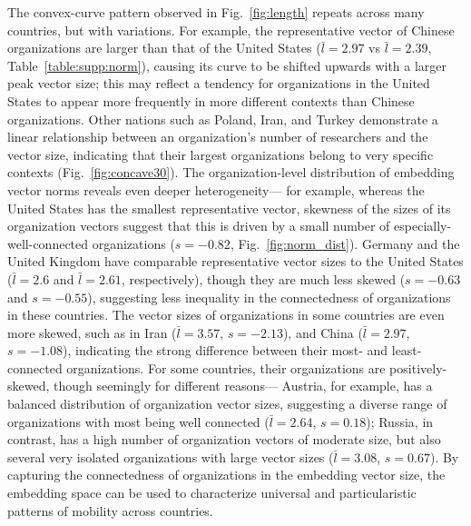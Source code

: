 \documentclass[12pt]{article} %
\begin{document}
The convex-curve pattern observed in Fig.~\ref{fig:length} repeats across many countries, but with variations.
For example, the representative vector of Chinese organizations are larger than that of the United States ($\bar{l} = 2.97$ vs $\bar{l} = 2.39$, Table~\ref{table:supp:norm}),  causing its curve to be shifted upwards with a larger peak vector size;
this may reflect a tendency for organizations in the United States to appear more frequently in more different contexts than Chinese organizations.
Other nations such as Poland, Iran, and Turkey demonstrate a linear relationship between an organization's number of researchers and the vector size, indicating that their largest organizations belong to very specific contexts (Fig.~\ref{fig:concave30}).
The organization-level distribution of embedding vector norms reveals even deeper heterogeneity---
for example, whereas the United States has the smallest representative vector, skewness of the sizes of its organization vectors suggest that this is driven by a small number of especially-well-connected organizations ($s = -0.82$, Fig.~\ref{fig:norm_dist}).
Germany and the United Kingdom have comparable representative vector sizes to the United States ($\bar{l} = 2.6$ and $\bar{l} = 2.61$, respectively), though they are much less skewed ($s = -0.63$ and $s = -0.55$), suggesting less inequality in the connectedness of organizations in these countries.
The vector sizes of organizations in some countries are even more skewed, such as in Iran ($\bar{l} = 3.57$, $s = -2.13$), and China ($\bar{l} = 2.97$, $s = -1.08$), indicating the strong difference between their most- and least-connected organizations.
For some countries, their organizations are positively-skewed, though seemingly for different reasons---
Austria, for example, has a balanced distribution of organization vector sizes, suggesting a diverse range of organizations with most being well connected ($\bar{l} =2.64$, $s = 0.18$);
Russia, in contrast, has a high number of organization vectors of moderate size, but also several very isolated organizations with large vector sizes ($\bar{l} = 3.08$, $s = 0.67$).
By capturing the connectedness of organizations in the embedding vector size, the embedding space can be used to characterize universal and particularistic patterns of mobility across countries.


\newpage
\end{document}
